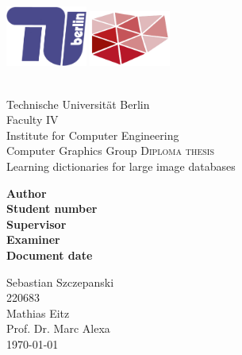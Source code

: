 
\begin{titlepage}


\includegraphics[width=0.2\textwidth]{images/logo/tu-logo_2d_blau.png}
\hfill
\includegraphics[width=0.2\textwidth]{images/logo/dgm_red.pdf}\\
\vspace{20pt}\\
\begin{center} 
Technische Universit\"{a}t Berlin\\
Faculty IV\\
Institute for Computer Engineering\\
Computer Graphics Group
\vfill
\textsc{\Large Diploma thesis}\\[0.5cm]
{\huge Learning dictionaries for large image databases}\\
[0.4cm]


\vfill
\begin{minipage}[t]{0.48\textwidth}
\flushright
\textbf{Author}\\
\textbf{Student number}\\
\textbf{Supervisor}\\
\textbf{Examiner}\\
\textbf{Document date}
\end{minipage}
\begin{minipage}[t]{0.48\textwidth}
\flushleft 
Sebastian Szczepanski\\
220683\\
Mathias Eitz\\
Prof. Dr. Marc Alexa\\
\today{}
\end{minipage}
\end{center}

\end{titlepage}

\clearpage

